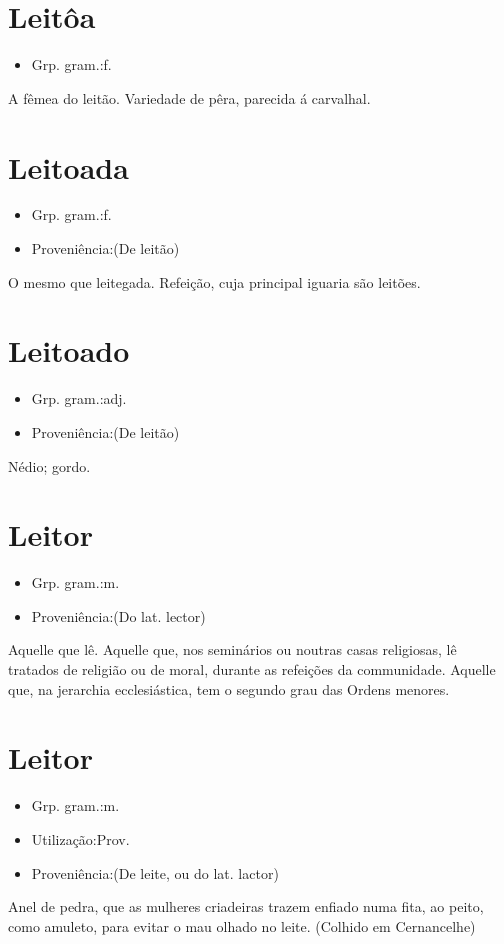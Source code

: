 \section{Leitôa}
\begin{itemize}
\item {Grp. gram.:f.}
\end{itemize}
A fêmea do leitão.
Variedade de pêra, parecida á carvalhal.
\section{Leitoada}
\begin{itemize}
\item {Grp. gram.:f.}
\end{itemize}
\begin{itemize}
\item {Proveniência:(De \textunderscore leitão\textunderscore )}
\end{itemize}
O mesmo que \textunderscore leitegada\textunderscore .
Refeição, cuja principal iguaria são leitões.
\section{Leitoado}
\begin{itemize}
\item {Grp. gram.:adj.}
\end{itemize}
\begin{itemize}
\item {Proveniência:(De \textunderscore leitão\textunderscore )}
\end{itemize}
Nédio; gordo.
\section{Leitor}
\begin{itemize}
\item {Grp. gram.:m.}
\end{itemize}
\begin{itemize}
\item {Proveniência:(Do lat. \textunderscore lector\textunderscore )}
\end{itemize}
Aquelle que lê.
Aquelle que, nos seminários ou noutras casas religiosas, lê tratados de religião ou de moral, durante as refeições da communidade.
Aquelle que, na jerarchia ecclesiástica, tem o segundo grau das Ordens menores.
\section{Leitor}
\begin{itemize}
\item {Grp. gram.:m.}
\end{itemize}
\begin{itemize}
\item {Utilização:Prov.}
\end{itemize}
\begin{itemize}
\item {Proveniência:(De \textunderscore leite\textunderscore , ou do lat. \textunderscore lactor\textunderscore )}
\end{itemize}
Anel de pedra, que as mulheres criadeiras trazem enfiado numa fita, ao peito, como amuleto, para evitar o mau olhado no leite. (Colhido em Cernancelhe)
